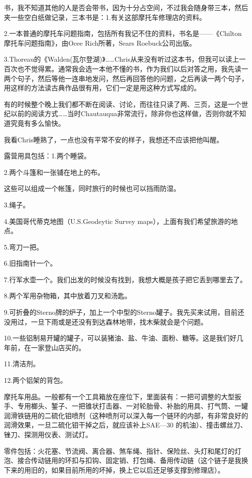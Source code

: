 \documentclass[UTF8]{article}
\begin{document}
\par 书，我不知道其他的人是否会带书，因为十分占空间，不过我会随身带三本，然后夹一些空白纸做记录，三本书是：1.有关这部摩托车修理店的资料。
\par 2.一本普通的摩托车问题指南，包括所有我记不住的资料，书名是——《Chilton摩托车问题指南》，由Ocee Rich所著，Sears Roebuck公司出版。
\par 3.Thoreau的《Walden(瓦尔登湖)》……Chris从来没有听过这本书，但我可以读上一百次也不觉得累。通常我会选一本他不懂的书，作为我们以后对答之用，我先读一两个句子，然后等他一连串地发问，然后再回答他的问题，之后再读一两个句子，用这样的方法读古典作品很有用，它们一定是用这种方式写成的。
\par 有的时候整个晚上我们都不断在阅读、讨论，而往往只读了两、三页，这是一个世纪以前的阅读方式……当时Chautauqua非常流行，除非你也这样做，否则你就不知道究竟有多么愉快。
\par 我看Chris睡熟了，一点也没有平常不安的样子，我想还不应该把他叫醒。
\par 露营用具包括：1.两个睡袋。
\par 2.两个斗篷和一张铺在地上的布。
\par 这些可以组成一个帐篷，同时旅行的时候也可以挡雨防湿。
\par 3.绳子。
\par 4.美国哥代蒂克地图（U.S.Geodeytic Survey maps），上面有我们希望旅游的地点。
\par 5.弯刀一把。
\par 6.旧指南针一个。
\par 7.行军水壶一个。我们出发的时候没有找到，我想大概是孩子把它丢到哪里去了。
\par 8.两个军用杂物箱，其中放着刀叉和汤匙。
\par 9.可折叠的Sterno牌的炉子，加上一个中型的Sterno罐子。我先买来试用，目前还没用过，一旦下雨或是还没有到达森林地带，找木柴就会是个问题。
\par 10.一些铝制易开罐的罐子，可以装猪油、盐、牛油、面粉、糖等。这是我们好几年前，在一家登山店买的。
\par 11.清洁剂。
\par 12.两个铝架的背包。
\par 摩托车用品。一般都有一个工具箱放在座位下，里面装有：一把可调整的大型扳手、专用榔头、錾子、一把锥状打击器、一对轮胎骨、补胎的用具、打气筒、一罐润滑铁链用的二硫化钼喷剂（这种喷剂可以深入每一个链环的内部，有非常良好的润滑效果，一旦二硫化钼干掉之后，就应该补上SAE—30 的机油）、撞击螺丝刀、锉刀、探测用仪表、测试灯。
\par 零件包括：火花塞、节流阀、离合器、煞车绳、指针、保险丝、头灯和尾灯的灯泡、接合传动链用的环扣与扣钩、固定销、打包绳、备用传动链（这个链子是我换下来的用旧的，如果目前所用的坏掉，换上它以后还足够支撑到修理店）。
\end{document}
